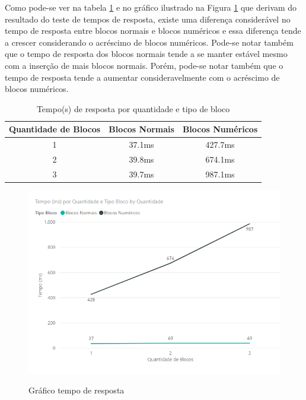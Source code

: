 Como pode-se ver na tabela \ref{table:tempo_resposta} e no gráfico ilustrado na Figura \ref{figura:ttr_grafico} que derivam do resultado do teste de tempos de resposta, existe uma diferença considerável no tempo de resposta entre blocos normais e blocos numéricos e essa diferença tende a crescer considerando o acréscimo de blocos numéricos. Pode-se notar também que o tempo de resposta dos blocos normais tende a se manter estável mesmo com a inserção de mais blocos normais. Porém, pode-se notar também que o tempo de resposta tende a aumentar consideravelmente com o acréscimo de blocos numéricos. 

    \begin{table}[H]
        \centering
        \caption{Tempo(s) de resposta por quantidade e tipo de bloco }
        \label{table:tempo_resposta}
        \begin{tabular}{ |c|c|c| } 
         \hline
        Quantidade de Blocos & Blocos Normais & Blocos Numéricos \\
         \hline
        1 & 37.1ms & 427.7ms \\
         \hline
        2 & 39.8ms & 674.1ms\\
         \hline
        3 & 39.7ms & 987.1ms\\    [0.5ex]    
         \hline
        
        \end{tabular}
    \end{table}

\begin{figure}[H]
    \caption{Gráfico tempo de resposta}
    \centering
    \includegraphics[width=14cm]{Imagens/Cap5/ttr_grafico.PNG}
    \label{figura:ttr_grafico}
\end{figure}

